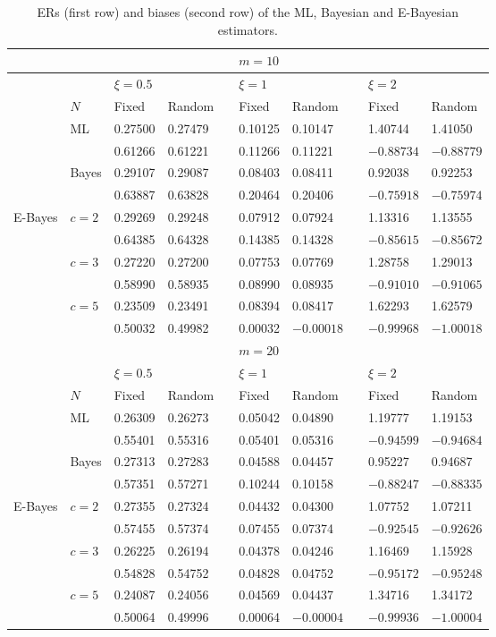 \documentclass[twoside]{article}
\begin{document}
\begin{table}[htp]
\begin{center}
\small
\caption{ERs (first row) and biases (second row) of the ML, Bayesian and E-Bayesian estimators.}\label{tab1-s}
\begin{tabular}{llllllllll}
  \hline
  &&   &&& $m=10$&&&  &\\
\hline  
  && $\xi=0.5$ &&& $\xi=1$&&& $\xi=2$&\\
\cline{3-4}\cline{6-7}\cline{9-10}
 &$N$& Fixed &Random&& Fixed& Random&& Fixed& Random\\
\hline
 &ML& 0.27500 &0.27479&& 0.10125&0.10147&& 1.40744& 1.41050\\
 && 0.61266 &0.61221&& 0.11266& 0.11221&& $-0.88734$& $-0.88779$\\
 &Bayes& 0.29107 &0.29087&& 0.08403& 0.08411&& 0.92038& 0.92253\\
 && 0.63887 &0.63828&& 0.20464& 0.20406&& $-0.75918$& $-0.75974$\\
 E-Bayes&$c=2$& 0.29269 &0.29248&& 0.07912& 0.07924&& 1.13316& 1.13555\\
 && 0.64385 &0.64328&& 0.14385& 0.14328&& $-0.85615$& $-0.85672$\\
 &$c=3$& 0.27220 &0.27200&& 0.07753& 0.07769&&1.28758& 1.29013\\
 &&  0.58990 &0.58935&& 0.08990& 0.08935&& $-0.91010$& $-0.91065$\\
 &$c=5$& 0.23509 &0.23491&& 0.08394& 0.08417&& 1.62293& 1.62579\\
&& 0.50032 &0.49982&& 0.00032& $-0.00018$&& $-0.99968$& $-1.00018$ \\
\hline
\hline
  &&   &&& $m=20$&&&  &\\
  \hline
  && $\xi=0.5$ &&& $\xi=1$&&& $\xi=2$&\\
\cline{3-4}\cline{6-7}\cline{9-10}
 &$N$& Fixed &Random&& Fixed& Random&& Fixed& Random\\
\hline
 &ML& 0.26309 &0.26273&& 0.05042& 0.04890&& 1.19777& 1.19153\\
 &&0.55401 & 0.55316&& 0.05401& 0.05316&& $-0.94599$& $-0.94684$\\
 &Bayes& 0.27313 &0.27283&& 0.04588&0.04457&& 0.95227& 0.94687\\
 &&0.57351 & 0.57271&& 0.10244& 0.10158&& $-0.88247$& $-0.88335$\\
 E-Bayes&$c=2$&0.27355 &0.27324&& 0.04432& 0.04300&& 1.07752& 1.07211\\
 &&0.57455 & 0.57374&& 0.07455& 0.07374&& $-0.92545$& $-0.92626$\\
 &$c=3$& 0.26225 &0.26194&& 0.04378& 0.04246&& 1.16469& 1.15928\\
 &&0.54828 & 0.54752&& 0.04828& 0.04752&&$-0.95172$& $-0.95248$\\
 &$c=5$& 0.24087 &0.24056&& 0.04569& 0.04437&& 1.34716& 1.34172\\
&&0.50064 & 0.49996&& 0.00064& $-0.00004$&& $-0.99936$& $-1.00004$\\
\hline
 \end{tabular}
\end{center}
\end{table}
\end{document}
